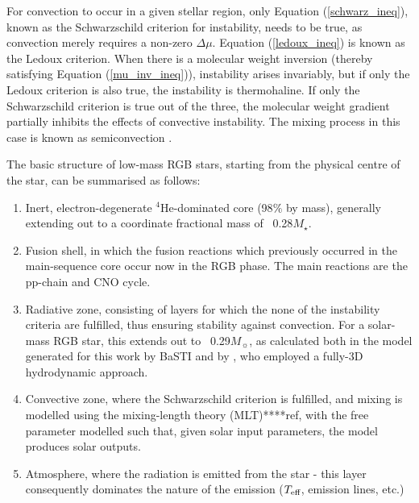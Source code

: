 \documentclass[usenatbib]{mnras}
\begin{document}

For convection to occur in a given stellar region, only Equation (\ref{schwarz_ineq}), known as the Schwarzschild criterion for instability, needs to be true, as convection merely requires a non-zero $\Delta\mu$. Equation (\ref{ledoux_ineq}) is known as the Ledoux criterion. When there is a molecular weight inversion (thereby satisfying Equation (\ref{mu_inv_ineq})), instability arises invariably, but if only the Ledoux criterion is also true, the instability is thermohaline. If only the Schwarzschild criterion is true out of the three, the molecular weight gradient partially inhibits the effects of convective instability. The mixing process in this case is known as semiconvection \citep{2016ApJ...817...54M}.


The basic structure of low-mass  RGB stars, starting from the physical centre of the star, can be summarised as follows:

\begin{enumerate}
\item Inert, electron-degenerate $^{4}$He-dominated core (98$\%$ by mass), generally extending out to a coordinate fractional mass of ~0.28$M_{\star}$.
\item Fusion shell, in which the fusion reactions which previously occurred in the main-sequence core occur now in the RGB phase. The main reactions are the pp-chain and CNO cycle.
\item Radiative zone, consisting of layers for which the none of the instability criteria are fulfilled, thus ensuring stability against convection. For a solar-mass RGB star, this extends out to ~0.29$M_{\sun}$, as calculated both in the model generated for this work by BaSTI and by \citet{2006Sci...314.1580E}, who employed a fully-3D hydrodynamic approach.
\item Convective zone, where the Schwarzschild criterion is fulfilled, and mixing is modelled using the mixing-length theory (MLT)****ref, with the free parameter modelled such that, given solar input parameters, the model produces solar outputs.
\item Atmosphere, where the radiation is emitted from the star - this layer consequently dominates the nature of the emission ($T_{\textnormal{eff}}$, emission lines, etc.)
\end{enumerate}
\end{document}
